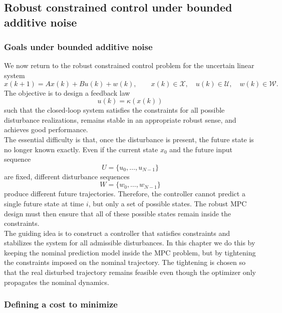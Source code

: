 \subsection{Robust constrained control under bounded additive noise}

\subsubsection{Goals under bounded additive noise}
We now return to the robust constrained control problem for the uncertain linear system
\[
    x(k+1) = Ax(k) + Bu(k) + w(k),
    \qquad
    x(k) \in \mathcal X,\quad u(k)\in\mathcal U,\quad w(k)\in\mathcal W.
\]
The objective is to design a feedback law
\[
    u(k)=\kappa(x(k))
\]
such that the closed-loop system satisfies the constraints for all possible disturbance
realizations, remains stable in an appropriate robust sense, and achieves good performance.\\
The essential difficulty is that, once the disturbance is present, the future state is no longer
known exactly. Even if the current state \(x_0\) and the future input sequence
\[
    U=\{u_0,\ldots,u_{N-1}\}
\]
are fixed, different disturbance sequences
\[
    W=\{w_0,\ldots,w_{N-1}\}
\]
produce different future trajectories. Therefore, the controller cannot predict a single future
state at time \(i\), but only a set of possible states. The robust MPC design must then ensure
that all of these possible states remain inside the constraints.\\

The guiding idea is to construct a controller that satisfies constraints and stabilizes the system
for all admissible disturbances. In this chapter we do this by keeping the nominal prediction
model inside the MPC problem, but by tightening the constraints imposed on the nominal
trajectory. The tightening is chosen so that the real disturbed trajectory remains feasible even
though the optimizer only propagates the nominal dynamics.

\subsubsection{Defining a cost to minimize}

